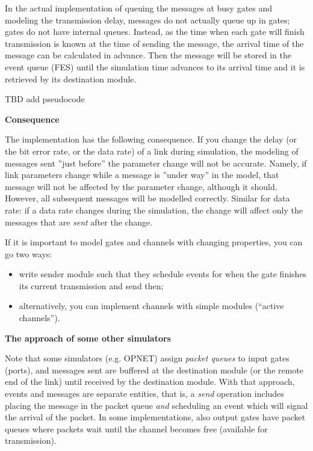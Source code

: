In the actual implementation of queuing the messages at busy gates and
modeling the transmission delay, messages do not actually queue up in
gates; gates do not have internal queues. Instead, as the time when
each gate will finish transmission is known at the time of sending the
message, the arrival time of the message can be
calculated in advance. Then the message will be stored in the event
queue (FES) until the simulation time advances to its
arrival time and it is retrieved by its destination module.



TBD add pseudocode


\textbf{Consequence}


The implementation has the following consequence. If you change the
delay (or the bit error rate, or the data rate) of a link during simulation, the modeling of messages sent ''just
before'' the parameter change will not be accurate. Namely, if link
parameters change while a message is ''under way'' in the model, that
message will not be affected by the parameter change, although it
should. However, all subsequent messages will be modelled correctly.
Similar for data rate: if a data rate changes during the simulation,
the change will affect only the messages that are \textit{sent} after
the change.

If it is important to model gates and channels with changing 
properties, you can go two ways:
\begin{itemize}
\item{write sender module such that they schedule events for when the 
gate finishes its current transmission and send then;}
\item{alternatively, you can implement channels with
    simple modules (``active channels'').}
\end{itemize}

\textbf{The approach of some other simulators}


Note that some simulators (e.g. OPNET) assign \textit{packet queues}
to input gates (ports), and messages sent are buffered at the
destination module (or the remote end of the link) until received by
the destination module. With that approach, events and messages are
separate entities, that is, a \textit{send} operation includes placing
the message in the packet queue \textit{and} scheduling an event which
will signal the arrival of the packet. In some implementations, also
output gates have packet queues where packets wait until the channel
becomes free (available for transmission).

